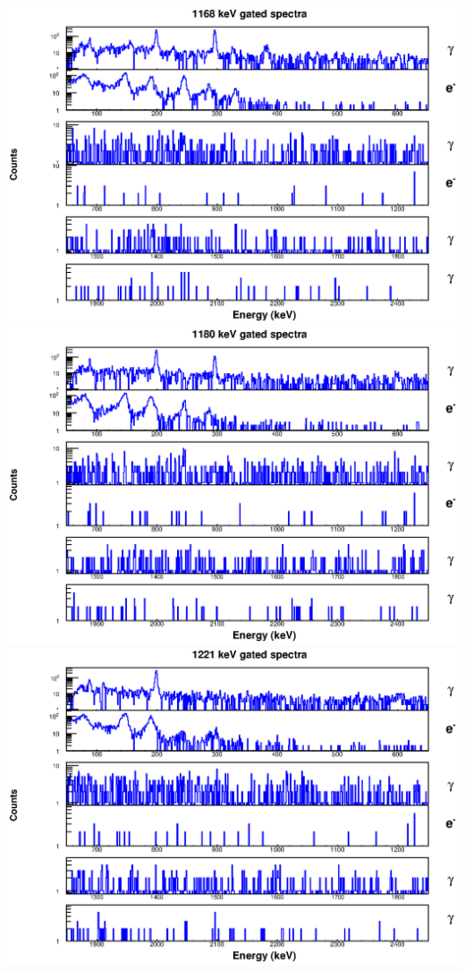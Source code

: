 \begin{landscape}
\includegraphics[scale=1.1]{156Gd_Appendix/1168_combined.eps}
\includegraphics[scale=1.1]{156Gd_Appendix/1180_combined.eps}
\includegraphics[scale=1.1]{156Gd_Appendix/1221_combined.eps}

\end{landscape}
